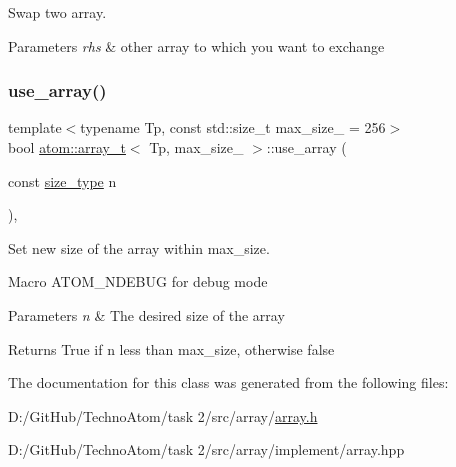 Swap two array. 


\begin{DoxyParams}{Parameters}
{\em rhs} & other array to which you want to exchange \\
\hline
\end{DoxyParams}
\mbox{\label{classatom_1_1array__t_a44737f61d6cac6e2a65fbee06b702755}} 
\subsubsection{\texorpdfstring{use\+\_\+array()}{use\_array()}}
{\footnotesize\ttfamily template$<$typename Tp, const std\+::size\+\_\+t max\+\_\+size\+\_\+ = 256$>$ \\
bool \hyperlink{classatom_1_1array__t}{atom\+::array\+\_\+t}$<$ Tp, max\+\_\+size\+\_\+ $>$\+::use\+\_\+array (\begin{DoxyParamCaption}\item[{const \hyperlink{classatom_1_1array__t_a8534f23c7f0082698cbd708e1f2e26ff}{size\+\_\+type}}]{n }\end{DoxyParamCaption})\hspace{0.3cm}{\ttfamily [inline]}, {\ttfamily [noexcept]}}



Set new size of the array within max\+\_\+size. 

Macro A\+T\+O\+M\+\_\+\+N\+D\+E\+B\+UG for debug mode 
\begin{DoxyParams}{Parameters}
{\em n} & The desired size of the array \\
\hline
\end{DoxyParams}
\begin{DoxyReturn}{Returns}
True if n less than max\+\_\+size, otherwise false 
\end{DoxyReturn}


The documentation for this class was generated from the following files\+:\begin{DoxyCompactItemize}
\item 
D\+:/\+Git\+Hub/\+Techno\+Atom/task 2/src/array/\hyperlink{array_8h}{array.\+h}\item 
D\+:/\+Git\+Hub/\+Techno\+Atom/task 2/src/array/implement/array.\+hpp\end{DoxyCompactItemize}
